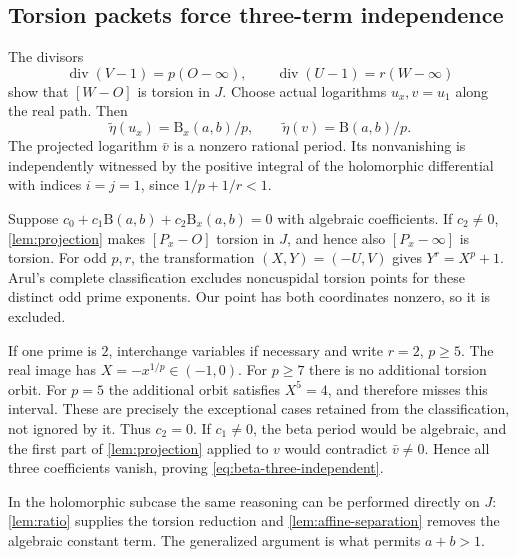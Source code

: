 \documentclass[11pt,a4paper]{article}
\numberwithin{equation}{section}
\theoremstyle{definition}
\theoremstyle{remark}
\newcommand{\B}{\mathrm B}
\newcommand{\divisor}{\operatorname{div}}
\begin{document}
\subsection{Torsion packets force three-term independence}
The divisors
\begin{equation}
 \divisor(V-1)=p(O-\infty),\qquad
 \divisor(U-1)=r(W-\infty)
\end{equation}
show that $[W-O]$ is torsion in $J$. Choose actual logarithms $u_x,v=u_1$
along the real path. Then
\begin{equation}
 \widetilde\eta(u_x)=\B_x(a,b)/p,
 \qquad\widetilde\eta(v)=\B(a,b)/p.
\end{equation}
The projected logarithm $\bar v$ is a nonzero rational period. Its
nonvanishing is independently witnessed by the positive integral of the
holomorphic differential with indices $i=j=1$, since $1/p+1/r<1$.

Suppose $c_0+c_1\B(a,b)+c_2\B_x(a,b)=0$ with algebraic coefficients.
If $c_2\ne0$, \cref{lem:projection} makes $[P_x-O]$ torsion in $J$,
and hence also $[P_x-\infty]$ is torsion. For odd $p,r$, the transformation
$(X,Y)=(-U,V)$ gives $Y^r=X^p+1$. Arul's complete classification
\cite[Theorem 6.2.21]{Arul} excludes noncuspidal torsion points for
these distinct odd prime exponents. Our point has both coordinates
nonzero, so it is excluded.

If one prime is $2$, interchange variables if necessary and write
$r=2$, $p\ge5$. The real image has $X=-x^{1/p}\in(-1,0)$. For
$p\ge7$ there is no additional torsion orbit. For $p=5$ the additional
orbit satisfies $X^5=4$, and therefore misses this interval. These are
precisely the exceptional cases retained from the classification, not
ignored by it. Thus $c_2=0$. If $c_1\ne0$, the beta period would be
algebraic, and the first part of \cref{lem:projection} applied to $v$
would contradict $\bar v\ne0$. Hence all three coefficients vanish,
proving \eqref{eq:beta-three-independent}.

In the holomorphic subcase the same reasoning can be performed directly
on $J$: \cref{lem:ratio} supplies the torsion reduction and
\cref{lem:affine-separation} removes the algebraic constant term.
The generalized argument is what permits $a+b>1$.
\end{document}
